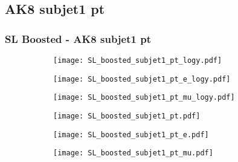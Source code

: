 \documentclass[aspectratio=169,8pt]{beamer}
\begin{document}
\subsection{AK8 subjet1 pt}
\begin{frame}
\frametitle{SL Boosted - AK8 subjet1 pt}
\begin{figure}
\captionsetup[subfigure]{labelformat=empty}
\begin{subfigure}{0.32\textwidth}
\texttt{[image: SL\_boosted\_subjet1\_pt\_logy.pdf]}
\vspace*{-0.15cm}
\end{subfigure}
\hfil
\begin{subfigure}{0.32\textwidth}
\texttt{[image: SL\_boosted\_subjet1\_pt\_e\_logy.pdf]}
\vspace*{-0.15cm}
\end{subfigure}
\hfil
\begin{subfigure}{0.32\textwidth}
\texttt{[image: SL\_boosted\_subjet1\_pt\_mu\_logy.pdf]}
\vspace*{-0.15cm}
\end{subfigure}
\hfil
\begin{subfigure}{0.32\textwidth}
\texttt{[image: SL\_boosted\_subjet1\_pt.pdf]}
\vspace*{-0.15cm}
\end{subfigure}
\hfil
\begin{subfigure}{0.32\textwidth}
\texttt{[image: SL\_boosted\_subjet1\_pt\_e.pdf]}
\vspace*{-0.15cm}
\end{subfigure}
\hfil
\begin{subfigure}{0.32\textwidth}
\texttt{[image: SL\_boosted\_subjet1\_pt\_mu.pdf]}
\vspace*{-0.15cm}
\end{subfigure}
\hfil
\end{figure}
\end{frame}
\newpage
\end{document}
